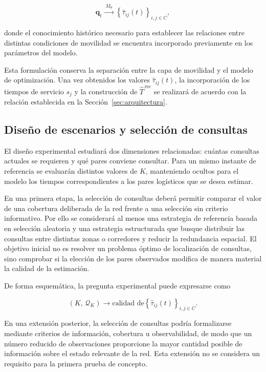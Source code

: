 \documentclass[11pt]{article}
\begin{document}
\[
\mathbf{q}_t
\xrightarrow{\;M_{\theta}\;}
\left\{
\widehat{\tau}_{ij}(t)
\right\}_{i,j\in C},
\]

donde el conocimiento histórico necesario para establecer las relaciones
entre distintas condiciones de movilidad se encuentra incorporado previamente
en los parámetros del modelo.

Esta formulación conserva la separación entre la capa de movilidad y el modelo
de optimización. Una vez obtenidos los valores
\(\widehat{\tau}_{ij}(t)\), la incorporación de los tiempos de servicio
\(s_j\) y la construcción de \(\widehat{T}^{\,\mathrm{rec}}\) se realizará de
acuerdo con la relación establecida en la Sección~\ref{sec:arquitectura}.

\subsection{Diseño de escenarios y selección de consultas}
\label{sec:escenarios}

El diseño experimental estudiará dos dimensiones relacionadas: cuántas
consultas actuales se requieren y qué pares conviene consultar. Para un mismo
instante de referencia se evaluarán distintos valores de \(K\), manteniendo
ocultos para el modelo los tiempos correspondientes a los pares logísticos
que se desea estimar.

En una primera etapa, la selección de consultas deberá permitir comparar el
valor de una cobertura deliberada de la red frente a una selección sin
criterio informativo. Por ello se considerará al menos una estrategia de
referencia basada en selección aleatoria y una estrategia estructurada que
busque distribuir las consultas entre distintas zonas o corredores y reducir
la redundancia espacial. El objetivo inicial no es resolver un problema
óptimo de localización de consultas, sino comprobar si la elección de los
pares observados modifica de manera material la calidad de la estimación.

De forma esquemática, la pregunta experimental puede expresarse como

\[
(K,\,\mathcal{Q}_K)
\longrightarrow
\text{calidad de}
\left\{
\widehat{\tau}_{ij}(t)
\right\}_{i,j\in C}.
\]

En una extensión posterior, la selección de consultas podría formalizarse
mediante criterios de información, cobertura u observabilidad, de modo que un
número reducido de observaciones proporcione la mayor cantidad posible de
información sobre el estado relevante de la red. Esta extensión no se
considera un requisito para la primera prueba de concepto.
\end{document}
